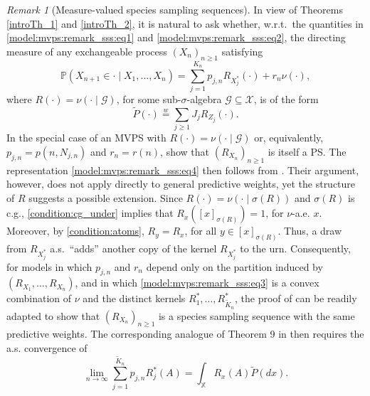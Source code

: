 \documentclass[a4paper]{article}
\theoremstyle{plain}
\theoremstyle{remark}
\newtheorem{remark}[theorem]{Remark}
\theoremstyle{definition}
\begin{document}
\begin{remark}[Measure-valued species sampling sequences]
In view of Theorems \ref{introTh_1} and \ref{introTh_2}, it is natural to ask whether, w.r.t.~the quantities in \eqref{model:mvps:remark_sss:eq1} and \eqref{model:mvps:remark_sss:eq2}, the directing measure of any exchangeable process $(X_n)_{n\geq1}$ satisfying
\begin{equation}\label{model:mvps:remark_sss:eq3}
\mathbb{P}(X_{n+1}\in\cdot\mid X_1,\ldots,X_n)=\sum_{j=1}^{K_n}p_{j,n}R_{X_j^*}(\cdot)+r_n\nu(\cdot),
\end{equation}
where $R(\cdot)=\nu(\cdot\mid\mathcal{G})$, for some sub-$\sigma$-algebra $\mathcal{G}\subseteq\mathcal{X}$, is of the form
\begin{equation}\label{model:mvps:remark_sss:eq4}
\tilde{P}(\cdot)\overset{w}{=}\sum_{j\geq1}J_jR_{Z_j}(\cdot).
\end{equation}
In the special case of an MVPS with $R(\cdot)=\nu(\cdot\mid\mathcal{G})$ or, equivalently, $p_{j,n}=p(n,N_{j,n})$ and $r_n=r(n)$, \citet[][Theorem 8]{berti2023kernel} show that $(R_{X_n})_{n\geq1}$ is itself a PS. The representation \eqref{model:mvps:remark_sss:eq4} then follows from \citet[][Theorem 9]{berti2023kernel}. Their argument, however, does not apply directly to general predictive weights, yet the structure of $R$ suggests a possible extension. Since $R(\cdot)=\nu(\cdot\mid\sigma(R))$ and $\sigma(R)$ is c.g., \eqref{condition:cg_under} implies that  $R_x([x]_{\sigma(R)})=1$, for $\nu$-a.e. $x$. Moreover, by \eqref{condition:atoms}, $R_y=R_x$, for all $y\in[x]_{\sigma(R)}$. Thus, a draw from $R_{X_j^*}$ a.s.~``adds'' another copy of the kernel $R_{X_j^*}$ to the urn. Consequently, for models in which $p_{j,n}$ and $r_n$ depend only on the partition induced by $(R_{X_1},\ldots,R_{X_n})$, and in which \eqref{model:mvps:remark_sss:eq3} is a convex combination of $\nu$ and the distinct kernels $R_1^*,\ldots,R_{\tilde{K}_n}^*$, the proof of \citet[][Theorem 8]{berti2023kernel} can be readily adapted to show that $(R_{X_n})_{n\geq1}$ is a species sampling sequence with the same predictive weights. The corresponding analogue of Theorem 9 in \cite{berti2023kernel} then requires the a.s. convergence of
\[\lim_{n\rightarrow\infty}\sum_{j=1}^{\tilde{K}_n}p_{j,n}R_j^*(A)=\int_\mathbb{X}R_x(A)\tilde{P}(dx).\]


\end{remark}
\end{document}
